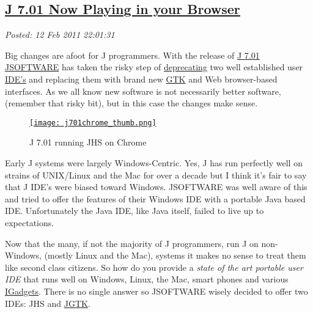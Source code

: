 %

\subsection*{\href{https://bakerjd99.wordpress.com/2011/02/12/j-7-01-now-playing-in-your-browser/}{J 7.01 Now Playing in your Browser}}


\noindent\emph{Posted: 12 Feb 2011 22:01:31}
\vspace{6pt}

Big changes are afoot for J programmers. With the release of
\href{http://www.jsoftware.com/docs/help701/user/relhigh.htm}{J 7.01}
\href{http://www.jsoftware.com/}{JSOFTWARE} has taken the risky step of
\href{http://en.wikipedia.org/wiki/Deprecation}{deprecating} two well
established user
\href{http://en.wikipedia.org/wiki/Integrated\_development\_environment}{IDE's}
and replacing them with brand new \href{http://www.gtk.org/}{GTK} and
Web browser-based interfaces. As we all know new software is not
necessarily better software, (remember that risky bit), but in this case
the changes make sense.


\captionsetup[figure]{labelformat=empty}
\begin{figure}[htbp]
\centering
\href{http://www.jsoftware.com/}{\texttt{[image: j701chrome\_thumb.png]}}
\caption{J 7.01  running JHS on  Chrome}
\label{fig:1070X0}
\end{figure}


Early J systems were largely Windows-Centric. Yes, J has run perfectly
well on strains of UNIX/Linux and the Mac for over a decade but I think
it's fair to say that J IDE's were biased toward Windows. JSOFTWARE was
well aware of this and tried to offer the features of their Windows IDE
with a portable Java based IDE. Unfortunately the Java IDE, like Java
itself, failed to live up to expectations.

Now that the many, if not the majority of J programmers, run J on
non-Windows, (mostly Linux and the Mac), systems it makes no sense to
treat them like second class citizens. So how do you provide a
\emph{state of the art portable user IDE} that runs well on Windows,
Linux, the Mac, smart phones and various
\href{http://pinoytutorial.com/techtorial/iboard-and-imat-future-of-apple-products/}{IGadgets}.
There is no single answer so JSOFTWARE wisely decided to offer two IDEs:
JHS and
\href{http://www.jsoftware.com/jwiki/System/Installation/J701/Gtk}{JGTK}.

